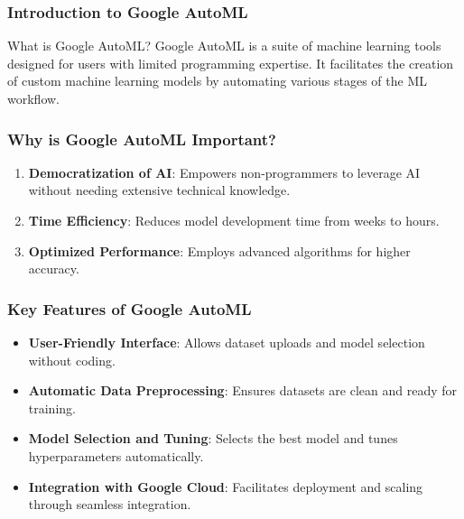 \documentclass[aspectratio=169]{beamer}
\begin{document}
\frame{\titlepage}

\begin{frame}[fragile]
    \titlepage
\end{frame}

\begin{frame}[fragile]
    \frametitle{Introduction to Google AutoML}
    \begin{block}{What is Google AutoML?}
        Google AutoML is a suite of machine learning tools designed for users with limited programming expertise. It facilitates the creation of custom machine learning models by automating various stages of the ML workflow.
    \end{block}
\end{frame}

\begin{frame}[fragile]
    \frametitle{Why is Google AutoML Important?}
    \begin{enumerate}
        \item \textbf{Democratization of AI}: Empowers non-programmers to leverage AI without needing extensive technical knowledge.
        \item \textbf{Time Efficiency}: Reduces model development time from weeks to hours.
        \item \textbf{Optimized Performance}: Employs advanced algorithms for higher accuracy.
    \end{enumerate}
\end{frame}

\begin{frame}[fragile]
    \frametitle{Key Features of Google AutoML}
    \begin{itemize}
        \item \textbf{User-Friendly Interface}: Allows dataset uploads and model selection without coding.
        \item \textbf{Automatic Data Preprocessing}: Ensures datasets are clean and ready for training.
        \item \textbf{Model Selection and Tuning}: Selects the best model and tunes hyperparameters automatically.
        \item \textbf{Integration with Google Cloud}: Facilitates deployment and scaling through seamless integration.
    \end{itemize}
\end{frame}
\end{document}
